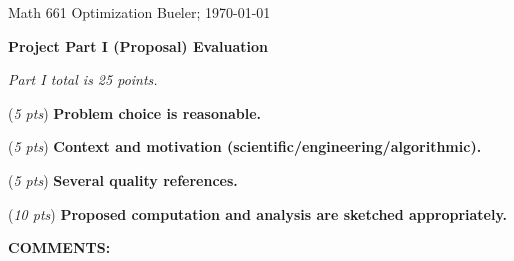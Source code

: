 \documentclass[12pt]{amsart}
\begin{document}
\scriptsize \noindent Math 661 Optimization \hfill  Bueler; \today
\normalsize\bigskip

\thispagestyle{empty}
\noindent\large\centerline{\textbf{Project Part I (Proposal) Evaluation}} \normalsize

\medskip
\noindent\centerline{\emph{Part I total is 25 points.}}

\bigskip\bigskip

\noindent (\emph{5 pts}) \textbf{Problem choice is reasonable.}  
\vspace{0.6in}

\noindent (\emph{5 pts}) \textbf{Context and motivation (scientific/engineering/algorithmic).}
\vspace{0.6in}

\noindent (\emph{5 pts}) \textbf{Several quality references.}
\vspace{0.6in}

\noindent (\emph{10 pts}) \textbf{Proposed computation and analysis are sketched appropriately.}
\vspace{0.8in}


\noindent \textbf{COMMENTS:}
\vfill
\end{document}
